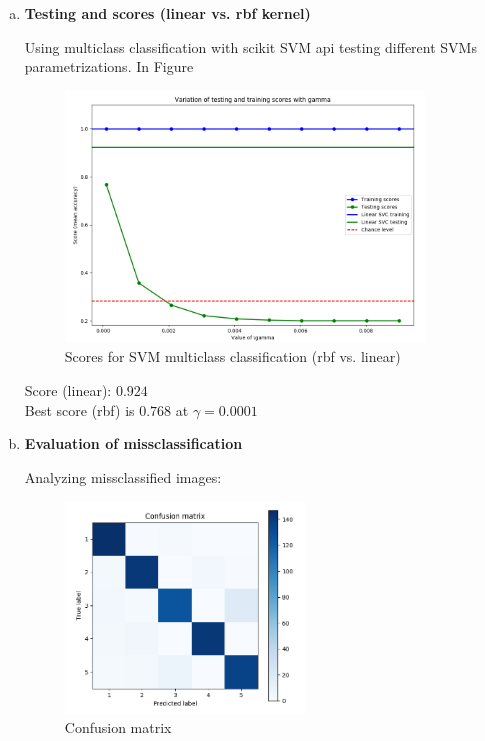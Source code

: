 \documentclass[12pt,a4paper]{article}
\begin{document}
\newpage
\begin{enumerate}[a)]
  
\newpage
  \item \textbf{Testing and scores (linear vs. rbf kernel)}

Using multiclass classification with scikit SVM api testing different SVMs
parametrizations. In Figure 

\begin{figure}[H]
	\centering
  \includegraphics[width=0.9\textwidth]{figures/svm3_a_scores.png}
	\caption{Scores for SVM multiclass classification (rbf vs. linear)}
	\label{svm3_a_scores}
\end{figure}

Score (linear): $0.924$\\
Best score (rbf) is $0.768$ at $\gamma = 0.0001$

\newpage
  \item \textbf{Evaluation of missclassification}

Analyzing missclassified images:

\begin{figure}[H]
	\centering
  \includegraphics[width=0.6\textwidth]{figures/svm3_b_cm.png}
	\caption{Confusion matrix}
	\label{svm3_b_cm}
\end{figure}


\end{enumerate}
\end{document}
